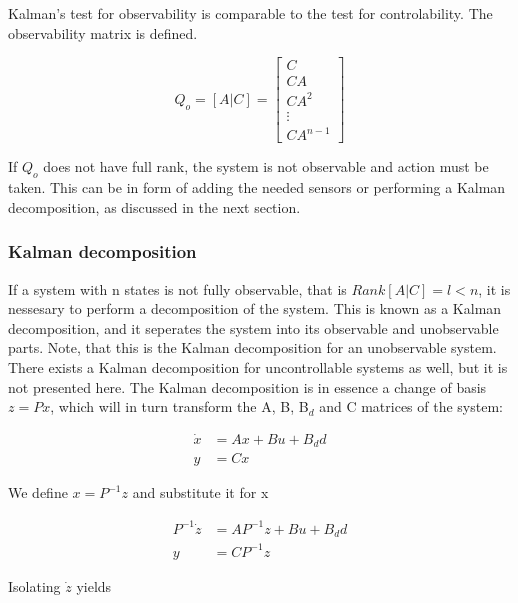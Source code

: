 Kalman's test for observability is comparable to the test for controlability. The observability matrix is defined.

\begin{equation}
	Q_o = [A|C] = \begin{bmatrix}
		C \\ CA \\ CA^2 \\ \vdots \\ CA^{n-1}
	\end{bmatrix}
\end{equation}

If $Q_o$ does not have full rank, the system is not observable and action must be taken. This can be in form of adding the needed sensors or performing a Kalman decomposition, as discussed in the next section.\\


\subsubsection{Kalman decomposition}
\label{sec:kalman}
If a system with n states is not fully observable, that is $Rank[A|C] = l < n$, it is nessesary to perform a decomposition of the system. This is known as a Kalman decomposition, and it seperates the system into its observable and unobservable parts. Note, that this is the Kalman decomposition for an unobservable system. There exists a Kalman decomposition for uncontrollable systems as well, but it is not presented here. The Kalman decomposition is in essence a change of basis $z=Px$, which will in turn transform the A, B, B$_d$ and C matrices of the system:


\begin{equation}
	\begin{split}
		\dot{x} & = Ax + Bu + B_dd \\
		y & = Cx
	\end{split}
\end{equation}

We define $x = P^{-1}z$ and substitute it for x

\begin{equation}
	\begin{split}
		P^{-1}\dot{z} & = AP^{-1}z + Bu + B_dd \\
		y & = CP^{-1}z
	\end{split}
\end{equation}

Isolating $\dot{z}$ yields

